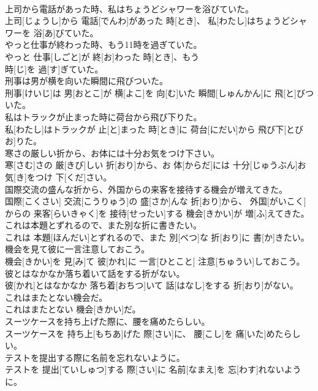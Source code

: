 \documentclass[8pt]{extreport}
\begin{document}
\begin{CJK}{UTF8}{min}
\\	上司から電話があった時、私はちょうどシャワーを浴びていた。	
\\	上司[じょうし]から 電話[でんわ]があった 時[とき]、 私[わたし]はちょうどシャワーを 浴[あ]びていた。
\\	やっと仕事が終わった時、もう11時を過ぎていた。	
\\	やっと 仕事[しごと]が 終[お]わった 時[とき]、もう 
\\	時[じ]を 過[す]ぎていた。
\\	刑事は男が横を向いた瞬間に飛びついた。	
\\	刑事[けいじ]は 男[おとこ]が 横[よこ]を 向[む]いた 瞬間[しゅんかん]に 飛[と]びついた。
\\	私はトラックが止まった時に荷台から飛び下りた。	
\\	私[わたし]はトラックが 止[と]まった 時[とき]に 荷台[にだい]から 飛び下[とびお]りた。
\\	寒さの厳しい折から、お体には十分お気をつけ下さい。	
\\	寒[さむ]さの 厳[きび]しい 折[おり]から、お 体[からだ]には 十分[じゅうぶん]お 気[き]をつけ 下[くだ]さい。
\\	国際交流の盛んな折から、外国からの来客を接待する機会が増えてきた。	
\\	国際[こくさい] 交流[こうりゅう]の 盛[さか]んな 折[おり]から、 外国[がいこく]からの 来客[らいきゃく]を 接待[せったい]する 機会[きかい]が 増[ふ]えてきた。
\\	これは本題とずれるので、また別な折に書きたい。	
\\	これは 本題[ほんだい]とずれるので、また 別[べつ]な 折[おり]に 書[か]きたい。
\\	機会を見て彼に一言注意しておこう。	
\\	機会[きかい]を 見[み]て 彼[かれ]に 一言[ひとこと] 注意[ちゅうい]しておこう。
\\	彼とはなかなか落ち着いて話をする折がない。	
\\	彼[かれ]とはなかなか 落ち着[おちつ]いて 話[はなし]をする 折[おり]がない。
\\	これはまたとない機会だ。	
\\	これはまたとない 機会[きかい]だ。
\\	スーツケースを持ち上げた際に、腰を痛めたらしい。	
\\	スーツケースを 持ち上[もちあ]げた 際[さい]に、 腰[こし]を 痛[いた]めたらしい。
\\	テストを提出する際に名前を忘れないように。	
\\	テストを 提出[ていしゅつ]する 際[さい]に 名前[なまえ]を 忘[わす]れないように。

\end{CJK}
\end{document}
